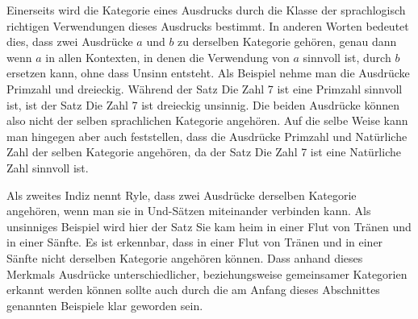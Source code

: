 \documentclass[a4paper]{article}
\begin{document}
Einerseits wird die Kategorie eines Ausdrucks durch die Klasse der sprachlogisch richtigen Verwendungen dieses Ausdrucks bestimmt. In anderen Worten bedeutet dies, dass zwei Ausdrücke \(a\) und \(b\) zu derselben Kategorie gehören, genau dann wenn \(a\) in allen Kontexten, in denen die Verwendung von \(a\) sinnvoll ist, durch \(b\) ersetzen kann, ohne dass Unsinn entsteht. Als Beispiel nehme man die Ausdrücke Primzahl und dreieckig. Während der Satz \glqq{}Die Zahl 7 ist eine Primzahl\grqq{} sinnvoll ist, ist der Satz \glqq{}Die Zahl 7 ist dreieckig\grqq{} unsinnig. Die beiden Ausdrücke können also nicht der selben sprachlichen Kategorie angehören. Auf die selbe Weise kann man hingegen aber auch feststellen, dass die Ausdrücke \glqq{}Primzahl\grqq{} und \glqq{}Natürliche Zahl\grqq{} der selben Kategorie angehören, da der Satz \glqq{}Die Zahl 7 ist eine Natürliche Zahl\grqq{} sinnvoll ist.

Als zweites Indiz nennt Ryle, dass zwei Ausdrücke derselben Kategorie angehören, wenn man sie in Und-Sätzen miteinander verbinden kann. Als unsinniges Beispiel wird hier der Satz \glqq{}Sie kam heim in einer Flut von Tränen und in einer Sänfte.\grqq{} Es ist erkennbar, dass \glqq{}in einer Flut von Tränen\grqq{} und \glqq{}in einer Sänfte\grqq{} nicht derselben Kategorie angehören können. Dass anhand dieses Merkmals Ausdrücke unterschiedlicher, beziehungsweise gemeinsamer Kategorien erkannt werden können sollte auch durch die am Anfang dieses Abschnittes genannten Beispiele klar geworden sein.
\end{document}
